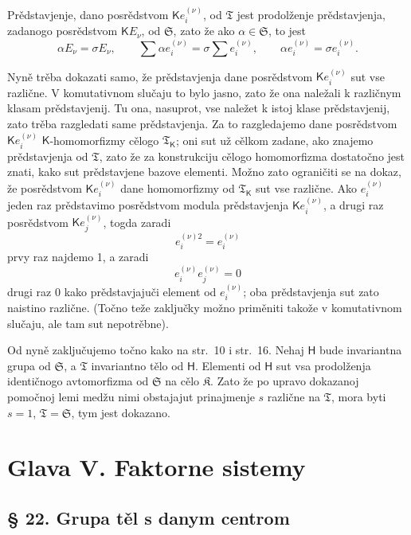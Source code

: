 \documentclass[11pt]{article}
\begin{document}
Prědstavjenje, dano posrědstvom \(\mathsf K e_i^{(\nu)}\), od \(\mathfrak T\) jest prodolženje prědstavjenja, zadanogo posrědstvom \(\mathsf K E_\nu\), od \(\mathfrak S\), zato že ako \(\alpha\in \mathfrak S\), to jest
\[
\alpha E_\nu=\sigma E_\nu,\qquad
\sum \alpha e_i^{(\nu)}=\sigma\sum e_i^{(\nu)},\qquad
\alpha e_i^{(\nu)}=\sigma e_i^{(\nu)}.
\]

Nyně trěba dokazati samo, že prědstavjenja dane posrědstvom \(\mathsf K e_i^{(\nu)}\) sut vse različne. V komutativnom slučaju to bylo jasno, zato že ona naležali k različnym klasam prědstavjenij. Tu ona, nasuprot, vse naležet k istoj klase prědstavjenij, zato trěba razgledati same prědstavjenja. Za to razgledajemo dane posrědstvom \(\mathsf K e_i^{(\nu)}\) \(\mathsf{K}\)-homomorfizmy cělogo \(\mathfrak T_{\mathsf{K}}\); oni sut už cělkom zadane, ako znajemo prědstavjenja od \(\mathfrak T\), zato že za konstrukciju cělogo homomorfizma dostatočno jest znati, kako sut prědstavjene bazove elementi. Možno zato ograničiti se na dokaz, že posrědstvom \(\mathsf K e_i^{(\nu)}\) dane homomorfizmy od \(\mathfrak T_{\mathsf{K}}\) sut vse različne. Ako \(e_i^{(\nu)}\) jeden raz prědstavimo posrědstvom modula prědstavjenja \(\mathsf K e_i^{(\nu)}\), a drugi raz posrědstvom \(\mathsf K e_j^{(\nu)}\), togda zaradi
\[
e_i^{(\nu)2}=e_i^{(\nu)}
\]
prvy raz najdemo 1, a zaradi
\[
e_i^{(\nu)}e_j^{(\nu)}=0
\]
drugi raz 0 kako prědstavjajuči element od \(e_i^{(\nu)}\); oba prědstavjenja sut zato naistino različne. (Točno teže zaključky možno priměniti takože v komutativnom slučaju, ale tam sut nepotrěbne).

Od nyně zaključujemo točno kako na str.~10 i str.~16. Nehaj \(\mathsf{H}\) bude invariantna grupa od \(\mathfrak S\), a \(\mathfrak T\) invariantno tělo od \(\mathsf{H}\). Elementi od \(\mathsf{H}\) sut vsa prodolženja identičnogo avtomorfizma od \(\mathfrak S\) na cělo \(\mathfrak K\). Zato že po upravo dokazanoj pomočnoj lemi medžu nimi obstajajut prinajmenje \(s\) različne na \(\mathfrak T\), mora byti \(s=1\), \(\mathfrak T=\mathfrak S\), tym jest dokazano.

\section*{Glava V. Faktorne sistemy}\label{kapitel-v.-faktorensysteme}

\subsection*{§ 22. Grupa těl s danym centrom}\label{die-gruppe-der-koerper-mit-gegebenem-zentrum}
\end{document}
